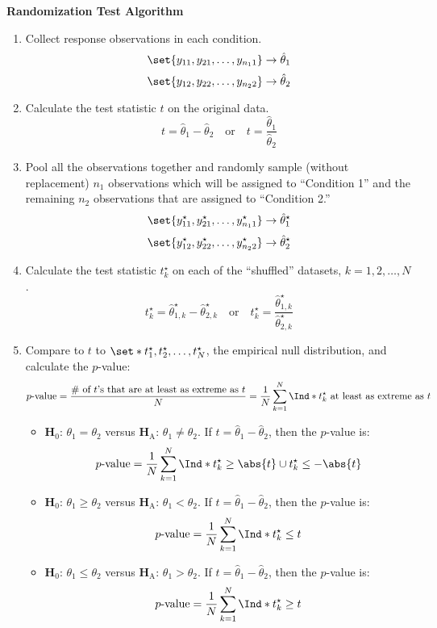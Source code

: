 \begin{framed}
      \textbf{Randomization Test Algorithm}
      \begin{enumerate}
            \item Collect response observations in each condition.
                  \[ \set{y_{11},y_{21},\ldots,y_{n_1 1}}\to \hat{\theta}_1 \]
                  \[ \set{y_{12},y_{22},\ldots,y_{n_2 2}}\to \hat{\theta}_2 \]
            \item Calculate the test statistic $ t $ on the original data.
                  \[ t=\hat{\theta}_1-\hat{\theta}_2\quad\text{or}\quad t=\frac{\hat{\theta}_1}{\hat{\theta}_2} \]
            \item Pool all the observations together and randomly sample (without replacement)
                  $ n_1 $ observations which will be assigned to ``Condition 1'' and the remaining $ n_2 $
                  observations that are assigned to ``Condition 2.''
                  \[ \set{y_{11}^\star,y_{21}^\star,\ldots,y_{n_1 1}^\star}\to \hat{\theta}_1^\star \]
                  \[ \set{y_{12}^\star,y_{22}^\star,\ldots,y_{n_2 2}^\star}\to \hat{\theta}_2^\star \]
            \item Calculate the test statistic $ t_k^\star $ on each of the ``shuffled'' datasets, $ k=1,2,\ldots,N $.
                  \[ t_k^\star=\hat{\theta}_{1,k}^\star-\hat{\theta}_{2,k}^\star\quad\text{or}\quad t_k^\star=\frac{\hat{\theta}_{1,k}^\star}{\hat{\theta}_{2,k}^\star}  \]
            \item Compare to $ t $ to $ \set*{t_1^\star,t_2^\star,\ldots,t_N^\star} $, the empirical
                  null distribution, and calculate the $ p $-value:
                  \[ p\text{-value}=\frac{\text{\# of $t$'s that are at least as extreme as $t$}}{N}=\frac{1}{N} \sum_{k=1}^{N} \Ind*{t_k^\star\text{ at least as extreme as $t$}}  \]
                  \begin{itemize}
                        \item $ \mathbf{H}_0 $: $ \theta_1=\theta_2 $ versus $ \mathbf{H}_\text{A} $: $ \theta_1\ne \theta_2 $. If $ t=\hat{\theta}_1-\hat{\theta}_2 $, then
                              the $ p $-value is:
                              \[ p\text{-value}=\frac{1}{N} \sum_{k=1}^{N} \Ind*{t_k^\star\ge \abs{t}\cup t_k^\star\le -\abs{t}} \]
                        \item $ \mathbf{H}_0 $: $ \theta_1\ge \theta_2 $ versus $ \mathbf{H}_\text{A} $: $ \theta_1<\theta_2 $. If $ t=\hat{\theta}_1-\hat{\theta}_2 $, then
                              the $ p $-value is:
                              \[ p\text{-value}=\frac{1}{N} \sum_{k=1}^{N} \Ind*{t_k^\star\le t} \]
                        \item $ \mathbf{H}_0 $: $ \theta_1\le \theta_2 $ versus $ \mathbf{H}_\text{A} $: $ \theta_1>\theta_2 $. If $ t=\hat{\theta}_1-\hat{\theta}_2 $, then
                              the $ p $-value is:
                              \[ p\text{-value}=\frac{1}{N} \sum_{k=1}^{N} \Ind*{t_k^\star\ge t} \]
                  \end{itemize}
      \end{enumerate}
\end{framed}
